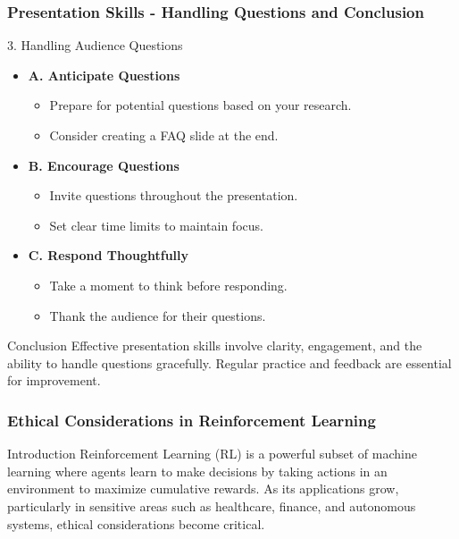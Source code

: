 \documentclass[aspectratio=169]{beamer}
\begin{document}
\begin{frame}[fragile]
    \frametitle{Presentation Skills - Handling Questions and Conclusion}
    \begin{block}{3. Handling Audience Questions}
        \begin{itemize}
            \item \textbf{A. Anticipate Questions}
            \begin{itemize}
                \item Prepare for potential questions based on your research.
                \item Consider creating a FAQ slide at the end.
            \end{itemize}

            \item \textbf{B. Encourage Questions}
            \begin{itemize}
                \item Invite questions throughout the presentation.
                \item Set clear time limits to maintain focus.
            \end{itemize}

            \item \textbf{C. Respond Thoughtfully}
            \begin{itemize}
                \item Take a moment to think before responding.
                \item Thank the audience for their questions.
            \end{itemize}
        \end{itemize}
    \end{block}
    
    \begin{block}{Conclusion}
        Effective presentation skills involve clarity, engagement, and the ability to handle questions gracefully. Regular practice and feedback are essential for improvement.
    \end{block}
\end{frame}

\begin{frame}[fragile]
    \frametitle{Ethical Considerations in Reinforcement Learning}
    \begin{block}{Introduction}
        Reinforcement Learning (RL) is a powerful subset of machine learning where agents learn to make decisions by taking actions in an environment to maximize cumulative rewards. 
        As its applications grow, particularly in sensitive areas such as healthcare, finance, and autonomous systems, ethical considerations become critical.
    \end{block}
\end{frame}
\end{document}
